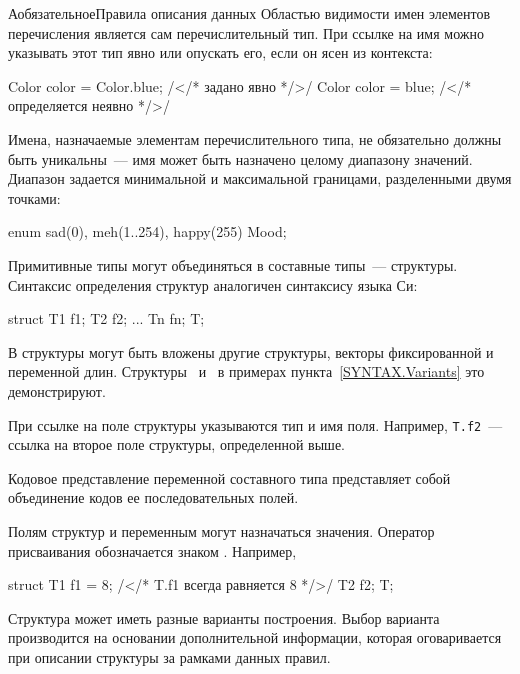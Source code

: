 \begin{appendix}{А}{обязательное}{Правила описания данных}
Областью видимости имен элементов перечисления является сам 
перечислительный тип. При ссылке на имя можно указывать этот тип явно или 
опускать его, если он ясен из контекста: 
%
\begin{codeblock}
Color color = Color.blue;     /</* задано явно */>/
Color color = blue;           /</* определяется неявно */>/
\end{codeblock}

Имена, назначаемые элементам перечислительного типа, не обязательно должны 
быть уникальны~--- имя может быть назначено целому диапазону значений.
Диапазон задается минимальной и максимальной границами, разделенными двумя 
точками:
%
\begin{codeblock}
enum { sad(0), meh(1..254), happy(255) } Mood;
\end{codeblock}

\label{SYNTAX.Structs}

Примитивные типы могут объединяться в составные типы~--- структуры. 
Синтаксис определения структур аналогичен синтаксису языка Си: 
%
\begin{codeblock}
struct {
  T1 f1;
  T2 f2;
  ...
  Tn fn;
} T;
\end{codeblock}

В структуры могут быть вложены другие структуры, векторы фиксированной и 
переменной длин. Структуры~ и~ в примерах 
пункта~\ref{SYNTAX.Variants} это демонстрируют.

При ссылке на поле структуры указываются тип и имя поля. Например, 
\lstinline{T.f2}~--- ссылка на второе поле структуры, определенной выше.

Кодовое представление переменной составного типа представляет собой
объединение кодов ее последовательных полей.

\label{SYNTAX.Consts}

Полям структур и переменным могут назначаться значения. Оператор присваивания 
обозначается знаком \code{=}. Например,
% 
\begin{codeblock}
struct {
  T1 f1 = 8;  /</* T.f1 всегда равняется 8 */>/
  T2 f2;
} T;
\end{codeblock}

\label{SYNTAX.Variants}

Структура может иметь разные варианты построения. Выбор варианта
производится на основании дополнительной информации, которая оговаривается
при описании структуры за рамками данных правил.


\end{appendix}
